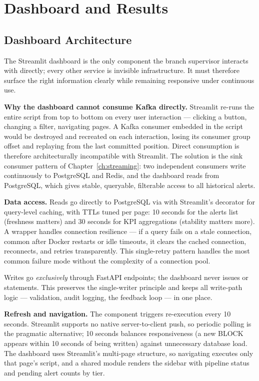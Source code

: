 \chapter{Dashboard and Results}
\label{ch:dashboard}

\section{Dashboard Architecture}

The Streamlit dashboard is the only component the branch supervisor interacts with directly; every other service is invisible infrastructure. It must therefore surface the right information clearly while remaining responsive under continuous use.

\textbf{Why the dashboard cannot consume Kafka directly.} Streamlit re-runs the entire script from top to bottom on every user interaction --- clicking a button, changing a filter, navigating pages. A Kafka consumer embedded in the script would be destroyed and recreated on each interaction, losing its consumer group offset and replaying from the last committed position. Direct consumption is therefore architecturally incompatible with Streamlit. The solution is the sink consumer pattern of Chapter~\ref{ch:streaming}: two independent consumers write continuously to PostgreSQL and Redis, and the dashboard reads from PostgreSQL, which gives stable, queryable, filterable access to all historical alerts.

\textbf{Data access.} Reads go directly to PostgreSQL via  with Streamlit's  decorator for query-level caching, with TTLs tuned per page: 10 seconds for the alerts list (freshness matters) and 30 seconds for KPI aggregations (stability matters more). A  wrapper handles connection resilience --- if a query fails on a stale connection, common after Docker restarts or idle timeouts, it clears the cached connection, reconnects, and retries transparently. This single-retry pattern handles the most common failure mode without the complexity of a connection pool.

Writes go \emph{exclusively} through FastAPI endpoints; the dashboard never issues  or  statements. This preserves the single-writer principle and keeps all write-path logic --- validation, audit logging, the feedback loop --- in one place.

\textbf{Refresh and navigation.} The  component triggers re-execution every 10 seconds. Streamlit supports no native server-to-client push, so periodic polling is the pragmatic alternative; 10 seconds balances responsiveness (a new BLOCK appears within 10 seconds of being written) against unnecessary database load. The dashboard uses Streamlit's multi-page structure, so navigating executes only that page's script, and a shared  module renders the sidebar with pipeline status and pending alert counts by tier.

